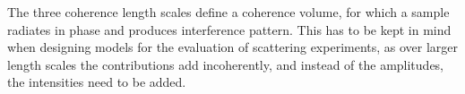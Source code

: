 \documentclass[\main/dresen_thesis.tex]{subfiles}
\begin{document}
    The three coherence length scales define a coherence volume, for which a sample radiates in phase and produces interference pattern.
    This has to be kept in mind when designing models for the evaluation of scattering experiments, as over larger length scales the contributions add incoherently, and instead of the amplitudes, the intensities need to be added.

\end{document}
